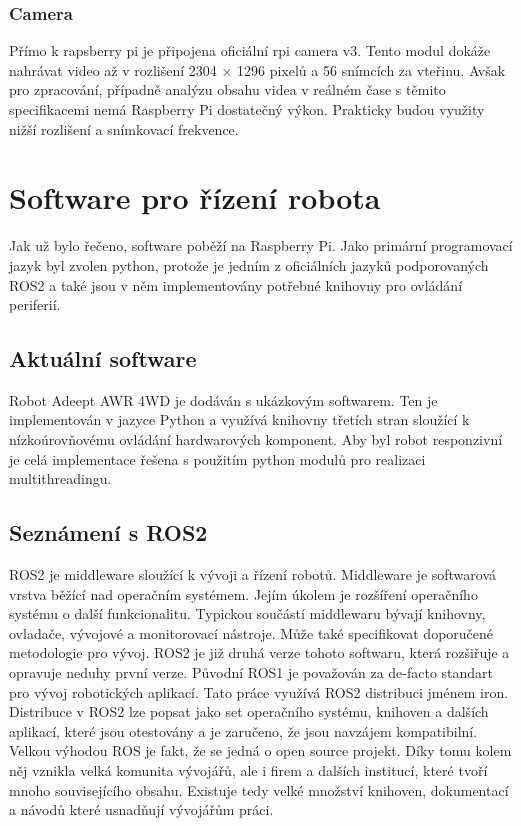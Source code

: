\subsection*{Camera}
Přímo k rapsberry pi je připojena oficiální rpi camera v3. Tento modul dokáže nahrávat video až v rozlišení 2304 × 1296 pixelů a 56 snímcích za vteřinu. Avšak pro zpracování, případně analýzu obsahu videa v reálném čase s těmito specifikacemi nemá Raspberry Pi dostatečný výkon. Prakticky budou využity nižší rozlišení a snímkovací frekvence. \cite{rpi_camera}

\chapter{Software pro řízení robota}
Jak už bylo řečeno, software poběží na Raspberry Pi. Jako primární programovací jazyk byl zvolen python, protože je jedním z oficiálních jazyků podporovaných ROS2 a také jsou v něm implementovány potřebné knihovny pro ovládání periferií.

\section{Aktuální software}
Robot Adeept AWR 4WD je dodáván s ukázkovým softwarem. Ten je implementován v jazyce Python a využívá knihovny třetích stran sloužící k nízkoúrovňovému ovládání hardwarových komponent. Aby byl robot responzivní je celá implementace řešena s použitím python modulů pro realizaci multithreadingu.

\section{Seznámení s ROS2}
ROS2 je middleware sloužící k vývoji a řízení robotů. Middleware je softwarová vrstva běžící nad operačním systémem. Jejím úkolem je rozšíření operačního systému o další funkcionalitu. Typickou součástí middlewaru bývají knihovny, ovladače, vývojové a monitorovací nástroje. Může také specifikovat doporučené metodologie pro vývoj. ROS2 je již druhá verze tohoto softwaru, která rozšiřuje a opravuje neduhy první verze. Původní ROS1 je považován za de-facto standart pro vývoj robotických aplikací.
Tato práce využívá ROS2 distribuci jménem iron. Distribuce v ROS2 lze popsat jako set operačního systému, knihoven a dalších aplikací, které jsou otestovány a je zaručeno, že jsou navzájem kompatibilní. Velkou výhodou ROS je fakt, že se jedná o open source projekt. Díky tomu kolem něj vznikla velká komunita vývojářů, ale i firem a dalších institucí, které tvoří mnoho souvisejícího obsahu. Existuje tedy velké množství knihoven, dokumentací a návodů které usnadňují vývojářům práci. \cite{ros2_introduction}

